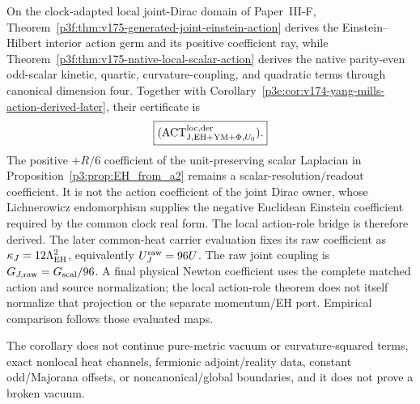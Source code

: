 \documentclass[12pt,a4paper]{article}
\begin{document}
\begin{corollary}
\label{p3e:cor:v175-einstein-scalar-actions-derived-later}
On the clock-adapted local joint-Dirac domain of Paper~III-F,
Theorem~\ref{p3f:thm:v175-generated-joint-einstein-action} derives the
Einstein--Hilbert interior action germ and its positive coefficient ray, while
Theorem~\ref{p3f:thm:v175-native-local-scalar-action} derives the native
parity-even odd-scalar kinetic, quartic, curvature-coupling, and quadratic
terms through canonical dimension four.  Together with
Corollary~\ref{p3e:cor:v174-yang-mills-action-derived-later}, their certificate
is
\[
 \boxed{(\mathrm{ACT}_{{\rm J,EH+YM+\Phi},U_0}^{\rm loc,der}).}
\]
The positive \(+R/6\) coefficient of the unit-preserving scalar Laplacian in
Proposition~\ref{p3:prop:EH_from_a2} remains a scalar-resolution/readout
coefficient.  It is not the action coefficient of the joint Dirac owner,
whose Lichnerowicz endomorphism supplies the negative Euclidean Einstein
coefficient required by the common clock real form.  The local action-role bridge is therefore derived. The later common-heat
carrier evaluation fixes its raw coefficient as
\(\kappa_J=12\Lambda_{\rm EH}^2\), equivalently
\(U_J^{\rm raw}=96U\).  The raw joint coupling is $G_{J,\rm raw}=G_{\rm scal}/96$. A final
physical Newton coefficient uses the complete matched action and source
normalization; the local action-role theorem does not itself normalize that
projection or the separate momentum/EH port. Empirical comparison follows
those evaluated maps.

The corollary does not continue
pure-metric vacuum or curvature-squared terms, exact nonlocal heat channels,
fermionic adjoint/reality data, constant odd/Majorana offsets, or
noncanonical/global boundaries, and it does not prove a broken vacuum.
\end{corollary}
\end{document}
